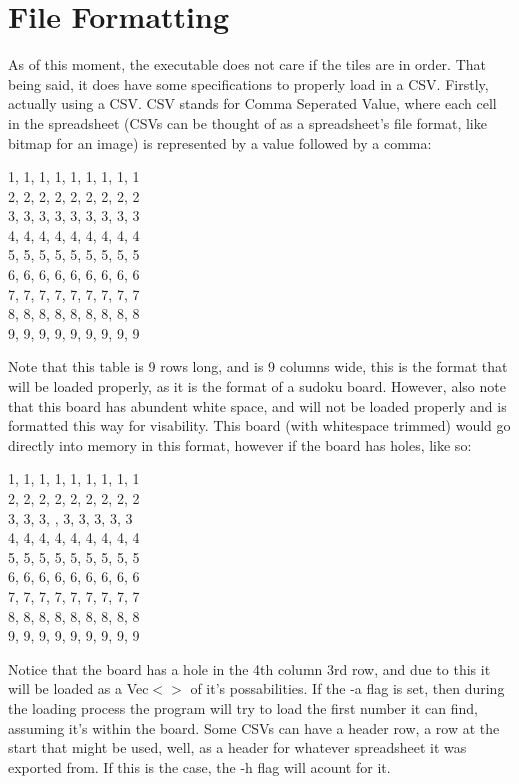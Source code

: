 \documentclass[11pt]{article}
\begin{document}
\section{File Formatting}
As of this moment, the executable does not care if the tiles are in order. That being said, it does have some specifications to properly load in a CSV. Firstly, actually using a CSV.
CSV stands for Comma Seperated Value, where each cell in the spreadsheet (CSVs can be thought of as a spreadsheet's file format, like bitmap for an image) is represented by a value followed by a comma:\\
\begin{center}
  1, 1, 1, 1, 1, 1, 1, 1, 1\\
  2, 2, 2, 2, 2, 2, 2, 2, 2\\
  3, 3, 3, 3, 3, 3, 3, 3, 3\\
  4, 4, 4, 4, 4, 4, 4, 4, 4\\
  5, 5, 5, 5, 5, 5, 5, 5, 5\\
  6, 6, 6, 6, 6, 6, 6, 6, 6\\
  7, 7, 7, 7, 7, 7, 7, 7, 7\\
  8, 8, 8, 8, 8, 8, 8, 8, 8\\
  9, 9, 9, 9, 9, 9, 9, 9, 9\\
\end{center}
Note that this table is 9 rows long, and is 9 columns wide, this is the format that will be loaded properly, as it is the format of a sudoku board. However, also note that this board has 
abundent white space, and will not be loaded properly and is formatted this way for visability. This board (with whitespace trimmed) would go directly into memory in this format, however if the board has holes, like so:\\
\begin{center}
  1, 1, 1, 1, 1, 1, 1, 1, 1\\
  2, 2, 2, 2, 2, 2, 2, 2, 2\\
  3, 3, 3,  , 3, 3, 3, 3, 3\\
  4, 4, 4, 4, 4, 4, 4, 4, 4\\
  5, 5, 5, 5, 5, 5, 5, 5, 5\\
  6, 6, 6, 6, 6, 6, 6, 6, 6\\
  7, 7, 7, 7, 7, 7, 7, 7, 7\\
  8, 8, 8, 8, 8, 8, 8, 8, 8\\
  9, 9, 9, 9, 9, 9, 9, 9, 9\\
\end{center}
Notice that the board has a hole in the 4th column 3rd row, and due to this it will be loaded as a Vec$<>$ of it's possabilities. If the -a flag is set, then 
during the loading process the program will try to load the first number it can find, assuming it's within the board. Some CSVs can have a header row, a row at the start that might 
be used, well, as a header for whatever spreadsheet it was exported from. If this is the case, the -h flag will acount for it. 
\end{document}
